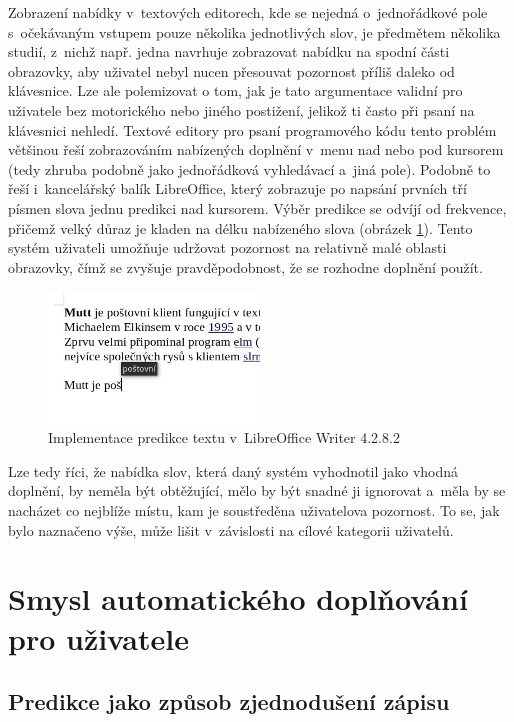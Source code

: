 \documentclass[a4paper,11pt,openany]{book} %
\begin{document}
Zobrazení nabídky v~textových editorech, kde se nejedná o~jednořádkové pole s~očekávaným vstupem pouze několika jednotlivých slov, je předmětem několika studií, z~nichž např. jedna navrhuje zobrazovat nabídku na spodní části obrazovky, aby uživatel nebyl nucen přesouvat pozornost příliš daleko od klávesnice. %
Lze ale polemizovat o tom, jak je tato argumentace validní pro uživatele bez motorického nebo jiného postižení, jelikož ti často při psaní na klávesnici nehledí. Textové editory pro psaní programového kódu tento problém většinou řeší zobrazováním nabízených doplnění v~menu nad nebo pod kursorem (tedy zhruba podobně jako jednořádková vyhledávací a~jiná pole). Podobně to řeší i~kancelářský balík LibreOffice, který zobrazuje po napsání prvních tří písmen slova jednu predikci nad kursorem. Výběr predikce se odvíjí od frekvence, přičemž velký důraz je kladen na délku nabízeného slova (obrázek \ref{fig:LOpredict}). Tento systém uživateli umožňuje udržovat pozornost na relativně malé oblasti obrazovky, čímž se zvyšuje pravděpodobnost, že se rozhodne doplnění použít. 

\begin{figure}[h]
	\centering
	\includegraphics[width=0.5\textwidth]{LO_prediction_1}
	\caption{Implementace predikce textu v~LibreOffice Writer 4.2.8.2}
	\label{fig:LOpredict}
\end{figure}

Lze tedy říci, že nabídka slov, která daný systém vyhodnotil jako vhodná doplnění, by neměla být obtěžující, mělo by být snadné ji ignorovat a~měla by se nacházet co nejblíže místu, kam je soustředěna uživatelova pozornost. To se, jak bylo naznačeno výše, může lišit v~závislosti na cílové kategorii uživatelů.

\chapter{Smysl automatického doplňování pro uživatele}

\section{Predikce jako způsob zjednodušení zápisu}
\end{document}
